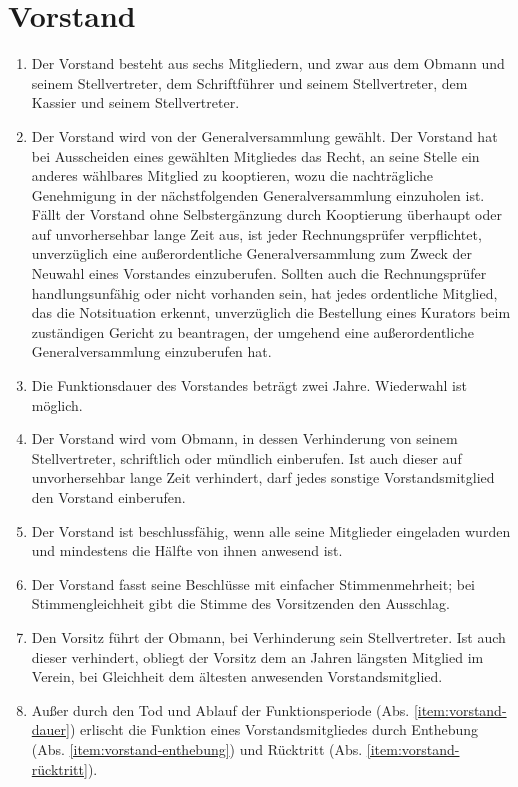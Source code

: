 \documentclass[a4paper,12pt]{article}
\begin{document}
\section{Vorstand} %
\label{sec:Vorstand}
\begin{enumerate}
\item\label{item:vorstand-mitglieder} Der Vorstand besteht aus sechs Mitgliedern, und zwar aus dem Obmann und seinem Stellvertreter, dem Schriftführer und seinem Stellvertreter, dem Kassier und seinem Stellvertreter.
\item\label{item:vorstand-wahlen} Der Vorstand wird von der Generalversammlung gewählt. Der Vorstand hat bei Ausscheiden eines gewählten Mitgliedes das Recht, an seine Stelle ein anderes wählbares Mitglied zu kooptieren, wozu die nachträgliche Genehmigung in der nächstfolgenden Generalversammlung einzuholen ist. Fällt der Vorstand ohne Selbstergänzung durch Kooptierung überhaupt oder auf unvorhersehbar lange Zeit aus, ist jeder Rechnungsprüfer verpflichtet, unverzüglich eine außerordentliche Generalversammlung zum Zweck der Neuwahl eines Vorstandes einzuberufen. Sollten auch die Rechnungsprüfer handlungsunfähig oder nicht vorhanden sein, hat jedes ordentliche Mitglied, das die Notsituation erkennt, unverzüglich die Bestellung eines Kurators beim zuständigen Gericht zu beantragen, der umgehend eine außerordentliche Generalversammlung einzuberufen hat.
\item\label{item:vorstand-dauer} Die Funktionsdauer des Vorstandes beträgt zwei Jahre. Wiederwahl ist möglich.
\item Der Vorstand wird vom Obmann, in dessen Verhinderung von seinem Stellvertreter, schriftlich oder mündlich einberufen. Ist auch dieser auf unvorhersehbar lange Zeit verhindert, darf jedes sonstige Vorstandsmitglied den Vorstand einberufen.
\item Der Vorstand ist beschlussfähig, wenn alle seine Mitglieder eingeladen wurden und mindestens die Hälfte von ihnen anwesend ist.
\item Der Vorstand fasst seine Beschlüsse mit einfacher Stimmenmehrheit; bei Stimmengleichheit gibt die Stimme des Vorsitzenden den Ausschlag.
\item Den Vorsitz führt der Obmann, bei Verhinderung sein Stellvertreter. Ist auch dieser verhindert, obliegt der Vorsitz dem an Jahren längsten Mitglied im Verein, bei Gleichheit dem ältesten anwesenden Vorstandsmitglied.
\item\label{item:vorstand-tod-ablauf} Außer durch den Tod und Ablauf der Funktionsperiode (Abs. \ref{item:vorstand-dauer}) erlischt die Funktion eines Vorstandsmitgliedes durch Enthebung (Abs. \ref{item:vorstand-enthebung}) und Rücktritt (Abs. \ref{item:vorstand-rücktritt}).

\end{enumerate}
\end{document}
